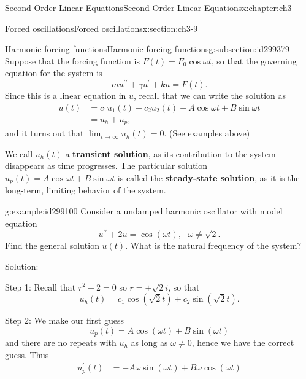 \documentclass[oneside,10pt,]{book}
\newcommand{\terminology}[1]{\textbf{#1}}
\numberwithin{equation}{section}
\numberwithin{equation}{section}
\newcommand{\amp}{&}
\begin{document}
\begin{chapterptx}{Second Order Linear Equations}{}{Second Order Linear Equations}{}{}{x:chapter:ch3}
\begin{sectionptx}{Forced oscillations}{}{Forced oscillations}{}{}{x:section:ch3-9}
\begin{introduction}{}
\end{introduction}%
%
%
\typeout{************************************************}
\typeout{************************************************}
%
\begin{subsectionptx}{Harmonic forcing functions}{}{Harmonic forcing functions}{}{}{g:subsection:id299379}
Suppose that the forcing function is \(F(t)=F_{0}\cos\omega t\), so that the governing equation for the system is%
\begin{equation*}
mu^{\prime\prime}+\gamma u^{\prime}+ku=F(t).
\end{equation*}
Since this is a linear equation in \(u\), recall that we can write the solution as%
\begin{align*}
u(t) \amp =c_{1}u_{1}(t)+c_{2}u_{2}(t)+A\cos\omega t+B\sin\omega t\\
\amp =u_{h}+u_{p},
\end{align*}
and it turns out that \(\lim_{t\to\infty}u_{h}(t)=0\). (See examples above)%
\par
We call \(u_{h}(t)\) a \terminology{transient solution}, as its contribution to the system disappears as time progresses. The particular solution \(u_{p}(t)=A\cos\omega t+B\sin\omega t\) is called the \terminology{steady-state solution}, as it is the long-term, limiting behavior of the system.%
\begin{example}{}{g:example:id299100}%
Consider a undamped harmonic oscillator with model equation%
\begin{equation*}
u^{\prime\prime}+2u=\cos\left(\omega t\right),\,\,\,\,\omega\neq\sqrt{2}.
\end{equation*}
Find the general solution \(u(t)\). What is the natural frequency of the system?%
\par
Solution:%
\par
Step 1: Recall that \(r^{2}+2=0\) so \(r=\pm\sqrt{2}i\), so that%
\begin{equation*}
u_{h}(t)=c_{1}\cos\left(\sqrt{2}t\right)+c_{2}\sin\left(\sqrt{2}t\right).
\end{equation*}
%
\par
Step 2: We make our first guess%
\begin{equation*}
u_{p}(t)=A\cos\left(\omega t\right)+B\sin\left(\omega t\right)
\end{equation*}
and there are no repeats with \(u_{h}\) as long as \(\omega\neq0\), hence we have the correct guess. Thus%
\begin{align*}
u_{p}^{\prime}(t) \amp =-A\omega\sin\left(\omega t\right)+B\omega\cos\left(\omega t\right)\\

\end{align*}
\end{example}
\end{subsectionptx}
\end{sectionptx}
\end{chapterptx}
\end{document}
